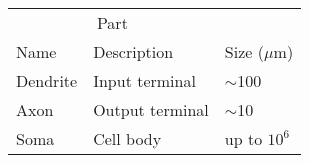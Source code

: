 \centering
\begin{tabular}{lll}
\toprule
\multicolumn{2}{c}{Part}                   \\
\cmidrule(r){1-2}
Name     & Description     & Size ($\mu$m) \\
\midrule
Dendrite & Input terminal  & $\sim$100     \\
Axon     & Output terminal & $\sim$10      \\
Soma     & Cell body       & up to $10^6$  \\
\bottomrule
\end{tabular}